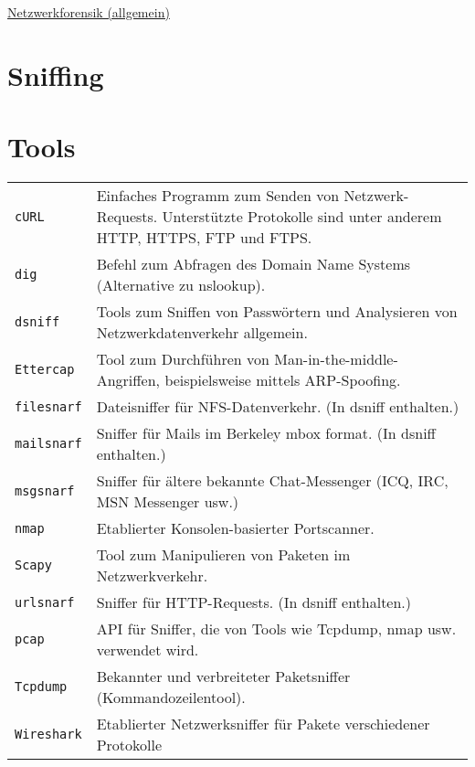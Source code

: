 \raggedright
\footnotesize
\begin{multicols}{3}	
	\setlength{\premulticols}{1pt}
	\setlength{\postmulticols}{1pt}
	\setlength{\multicolsep}{1pt}
	\setlength{\columnsep}{2pt}

\begin{center}
     \Large{\underline{Netzwerkforensik (allgemein)}} \\
\end{center}

\section{Sniffing}
\section{Tools}
\begin{tabular}{@{}p{\the\MyLen}
		@{}p{\linewidth-\the\MyLen}@{}}
	\texttt{cURL} & Einfaches Programm zum Senden von Netzwerk-Requests. Unterstützte Protokolle sind unter anderem HTTP, HTTPS, FTP und FTPS.\\
	\texttt{dig} & Befehl zum Abfragen des Domain Name Systems (Alternative zu nslookup).\\
	\texttt{dsniff} & Tools zum Sniffen von Passwörtern und Analysieren von Netzwerkdatenverkehr allgemein.\\
	\texttt{Ettercap} & Tool zum Durchführen von Man-in-the-middle-Angriffen, beispielsweise mittels ARP-Spoofing.\\
	\texttt{filesnarf} & Dateisniffer für NFS-Datenverkehr. (In dsniff enthalten.)\\
	\texttt{mailsnarf} & Sniffer für Mails im Berkeley mbox format. (In dsniff enthalten.)\\
	\texttt{msgsnarf} & Sniffer für ältere bekannte Chat-Messenger (ICQ, IRC, MSN Messenger usw.)\\
	\texttt{nmap} & Etablierter Konsolen-basierter Portscanner.\\
	\texttt{Scapy} & Tool zum Manipulieren von Paketen im Netzwerkverkehr.\\
	\texttt{urlsnarf} & Sniffer für HTTP-Requests. (In dsniff enthalten.)\\
	\texttt{pcap} & API für Sniffer, die von Tools wie Tcpdump, nmap usw. verwendet wird.\\
	\texttt{Tcpdump} & Bekannter und verbreiteter Paketsniffer (Kommandozeilentool).\\
	\texttt{Wireshark} & Etablierter Netzwerksniffer für Pakete verschiedener Protokolle\\
\end{tabular}
\end{multicols}
